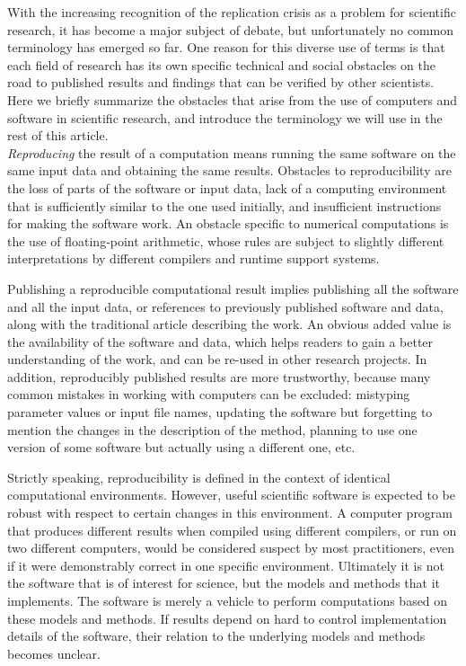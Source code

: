 \documentclass[a4paper,10pt, twocolumn]{article}
\begin{document}
With the increasing recognition of the replication crisis as a problem
for scientific research, it has become a major subject of debate, but
unfortunately no common terminology has emerged so far. One reason for
this diverse use of terms is that each field of research has its own
specific technical and social obstacles on the road to published
results and findings that can be verified by other scientists. Here we
briefly summarize the obstacles that arise from the use of computers
and software in scientific research, and introduce the terminology we
will use in the rest of this article.\\

\textit{Reproducing} the result of a computation means running the
same software on the same input data and obtaining the same results.
Obstacles to reproducibility are the loss of parts of the software or
input data, lack of a computing environment that is sufficiently
similar to the one used initially, and insufficient instructions for
making the software work. An obstacle specific to numerical
computations is the use of floating-point arithmetic, whose rules are
subject to slightly different interpretations by different compilers
and runtime support systems.

Publishing a reproducible computational result implies publishing all
the software and all the input data, or references to previously
published software and data, along with the traditional article
describing the work. An obvious added value is the availability of the
software and data, which helps readers to gain a better understanding
of the work, and can be re-used in other research projects. In
addition, reproducibly published results are more trustworthy, because
many common mistakes in working with computers can be excluded:
mistyping parameter values or input file names, updating the software
but forgetting to mention the changes in the description of the
method, planning to use one version of some software but actually
using a different one, etc.

Strictly speaking, reproducibility is defined in the context of
identical computational environments. However, useful scientific
software is expected to be robust with respect to certain changes in
this environment. A computer program that produces different results
when compiled using different compilers, or run on two different
computers, would be considered suspect by most practitioners, even if
it were demonstrably correct in one specific environment. Ultimately
it is not the software that is of interest for science, but the models
and methods that it implements. The software is merely a vehicle to
perform computations based on these models and methods. If results
depend on hard to control implementation details of the software,
their relation to the underlying models and methods becomes unclear.\\
\end{document}
